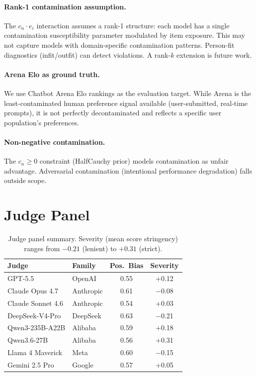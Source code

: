 \documentclass[11pt,twocolumn]{article}
\begin{document}
\paragraph{Rank-1 contamination assumption.} The $c_n \cdot e_i$ interaction assumes a rank-1 structure: each model has a single contamination susceptibility parameter modulated by item exposure. This may not capture models with domain-specific contamination patterns. Person-fit diagnostics (infit/outfit) can detect violations. A rank-$k$ extension is future work.

\paragraph{Arena Elo as ground truth.} We use Chatbot Arena Elo rankings as the evaluation target. While Arena is the least-contaminated human preference signal available (user-submitted, real-time prompts), it is not perfectly decontaminated and reflects a specific user population's preferences.

\paragraph{Non-negative contamination.} The $c_n \geq 0$ constraint (HalfCauchy prior) models contamination as unfair advantage. Adversarial contamination (intentional performance degradation) falls outside scope.

\appendix

\section{Judge Panel}
\label{sec:panel}

\begin{table}[h]
\centering
\small
\caption{Judge panel summary. Severity (mean score stringency) ranges from $-0.21$ (lenient) to $+0.31$ (strict).}
\label{tab:judges}
\begin{tabular}{@{}llcc@{}}
\toprule
Judge & Family & Pos.\ Bias & Severity \\
\midrule
GPT-5.5           & OpenAI    & 0.55 & +0.12 \\
Claude Opus 4.7   & Anthropic & 0.61 & $-$0.08 \\
Claude Sonnet 4.6 & Anthropic & 0.54 & +0.03 \\
DeepSeek-V4-Pro   & DeepSeek  & 0.63 & $-$0.21 \\
Qwen3-235B-A22B   & Alibaba   & 0.59 & +0.18 \\
Qwen3.6-27B       & Alibaba   & 0.56 & +0.31 \\
Llama 4 Maverick  & Meta      & 0.60 & $-$0.15 \\
Gemini 2.5 Pro    & Google    & 0.57 & +0.05 \\
\bottomrule
\end{tabular}
\end{table}
\end{document}

